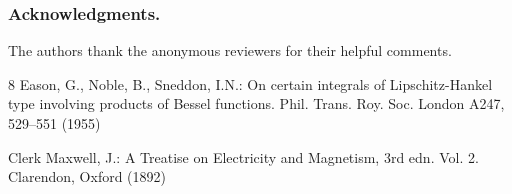 \documentclass[runningheads]{llncs}
\begin{document}
\subsubsection{Acknowledgments.} The authors thank the anonymous reviewers for their helpful comments.

\begin{thebibliography}{8}
Eason, G., Noble, B., Sneddon, I.N.: On certain integrals of Lipschitz-Hankel type involving products of Bessel functions. Phil. Trans. Roy. Soc. London A247, 529--551 (1955)

Clerk Maxwell, J.: A Treatise on Electricity and Magnetism, 3rd edn. Vol. 2. Clarendon, Oxford (1892)
\end{thebibliography}
\end{document}
